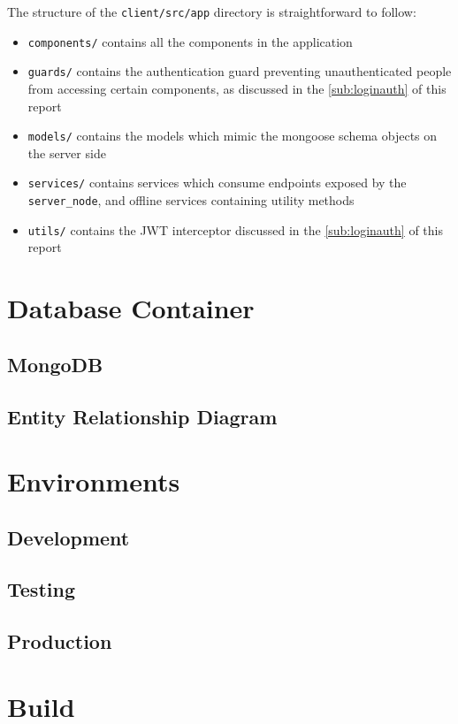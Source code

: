 The structure of the \texttt{client/src/app} directory is straightforward to follow:
\begin{itemize}
  \item \texttt{components/} contains all the components in the application
  \item \texttt{guards/} contains the authentication guard preventing unauthenticated people
    from accessing certain components, as discussed in the \autoref{sub:loginauth} of this report
  \item \texttt{models/} contains the models which mimic the mongoose schema objects on the server side
  \item \texttt{services/} contains services which consume endpoints exposed by the \texttt{server\_node},
    and offline services containing utility methods
  \item \texttt{utils/} contains the JWT interceptor discussed in the \autoref{sub:loginauth} of this report
\end{itemize}

\section{Database Container}
\subsection{MongoDB}

\subsection{Entity Relationship Diagram}


\section{Environments}
\subsection{Development}

\subsection{Testing}

\subsection{Production}

\section{Build}
